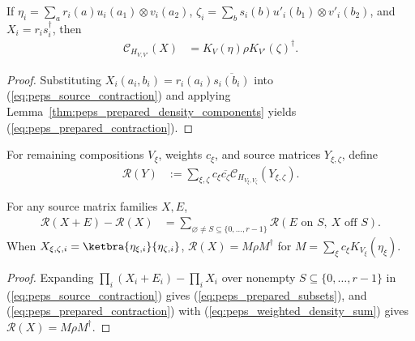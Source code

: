 \begin{lemma}
    \label{thm:peps_prepared_source_contraction}
    \leanok
    If $\eta_i=\sum_a r_i(a)u_i(a_1)\otimes v_i(a_2)$,
    $\zeta_i=\sum_b s_i(b)u'_i(b_1)\otimes v'_i(b_2)$, and $X_i=r_i s_i^\dagger$,
    then
    \begin{align}
        \mathcal C_{H_{V,V'}}(X)
         & =K_V(\eta)\rho K_{V'}(\zeta)^\dagger.
        \label{eq:peps_prepared_contraction}
    \end{align}
\end{lemma}
\begin{proof}
    \leanok
    Substituting $X_i(a_i,b_i)=r_i(a_i)\overline{s_i(b_i)}$ into
    (\ref{eq:peps_source_contraction}) and applying
    Lemma~\ref{thm:peps_prepared_density_components} yields
    (\ref{eq:peps_prepared_contraction}).
\end{proof}

\begin{definition}
    \label{def:peps_prepared_source_replacement}
    \leanok
    For remaining compositions $V_\xi$, weights $c_\xi$, and source matrices
    $Y_{\xi,\zeta}$, define
    \begin{align}
        \mathcal R(Y)
         & :=\sum_{\xi,\zeta}c_\xi\overline{c_\zeta}
        \mathcal C_{H_{V_\xi,V_\zeta}}(Y_{\xi,\zeta}).
        \label{eq:peps_prepared_replacement}
    \end{align}
\end{definition}
\begin{lemma}
    \label{thm:peps_prepared_subset_identity}
    \leanok
    For any source matrix families $X,E$,
    \begin{align}
        \mathcal R(X+E)-\mathcal R(X)
         & =\sum_{\varnothing\ne S\subseteq\{0,\ldots,r-1\}}
        \mathcal R(E\text{ on }S,\ X\text{ off }S).
        \label{eq:peps_prepared_subsets}
    \end{align}
    When $X_{\xi,\zeta,i}=\ketbra{\eta_{\xi,i}}{\eta_{\zeta,i}}$,
    $\mathcal R(X)=M\rho M^\dagger$ for $M=\sum_\xi c_\xi K_{V_\xi}(\eta_\xi)$.
\end{lemma}
\begin{proof}
    \leanok
    Expanding $\prod_i(X_i+E_i)-\prod_i X_i$ over nonempty
    $S\subseteq\{0,\ldots,r-1\}$ in (\ref{eq:peps_source_contraction}) gives
    (\ref{eq:peps_prepared_subsets}), and (\ref{eq:peps_prepared_contraction})
    with (\ref{eq:peps_weighted_density_sum}) gives $\mathcal R(X)=M\rho M^\dagger$.
\end{proof}

